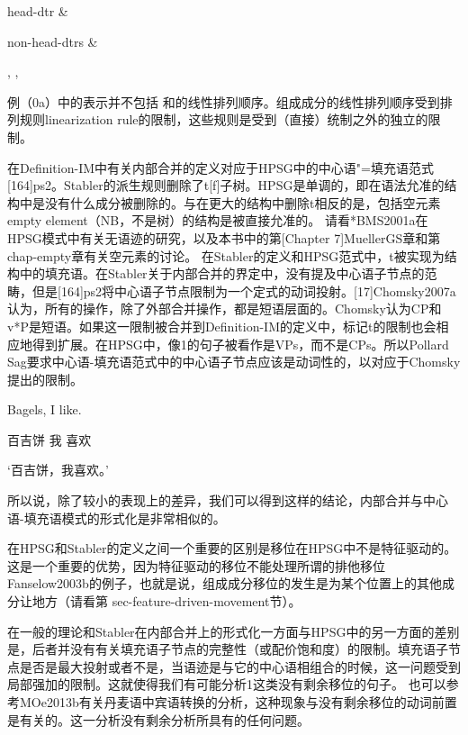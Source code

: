 head-dtr & 

non-head-dtrs &   


 ,  ,   

例（0a）中的表示并不包括 和的线性排列顺序。组成成分的线性排列顺序受到排列规则linearization rule的限制，这些规则是受到（直接）统制之外的独立的限制。




在Definition-IM中有关内部合并的定义对应于HPSG中的中心语"=填充语范式[164]ps2。Stabler的派生规则删除了t[f]子树。HPSG是单调的，即在语法允准的结构中是没有什么成分被删除的。与在更大的结构中删除t相反的是，包括空元素empty element（NB，不是树）的结构是被直接允准的。 
请看*BMS2001a在HPSG模式中有关无语迹的研究，以及本书中的第[Chapter 7]MuellerGS章和第 chap-empty章有关空元素的讨论。
在Stabler的定义和HPSG范式中，t被实现为结构中的填充语。在Stabler关于内部合并的界定中，没有提及中心语子节点的范畴，但是[164]ps2将中心语子节点限制为一个定式的动词投射。[17]Chomsky2007a认为，所有的操作，除了外部合并操作，都是短语层面的。Chomsky认为CP和v*P是短语。如果这一限制被合并到Definition-IM的定义中，标记t的限制也会相应地得到扩展。在HPSG中，像1的句子被看作是VPs，而不是CPs。所以Pollard  Sag要求中心语-填充语范式中的中心语子节点应该是动词性的，以对应于Chomsky提出的限制。














Bagels, I like.

百吉饼 我 喜欢

`百吉饼，我喜欢。'


所以说，除了较小的表现上的差异，我们可以得到这样的结论，内部合并与中心语-填充语模式的形式化是非常相似的。









在HPSG和Stabler的定义之间一个重要的区别是移位在HPSG中不是特征驱动的。这是一个重要的优势，因为特征驱动的移位不能处理所谓的排他移位Fanselow2003b的例子，也就是说，组成成分移位的发生是为某个位置上的其他成分让地方（请看第 sec-feature-driven-movement节）。





在一般的理论和Stabler在内部合并上的形式化一方面与HPSG中的另一方面的差别是，后者并没有有关填充语子节点的完整性（或配价饱和度）的限制。填充语子节点是否是最大投射或者不是，当语迹是与它的中心语相组合的时候，这一问题受到局部强加的限制。这就使得我们有可能分析1这类没有剩余移位的句子。 
也可以参考MOe2013b有关丹麦语中宾语转换的分析，这种现象与没有剩余移位的动词前置是有关的。这一分析没有剩余分析所具有的任何问题。












